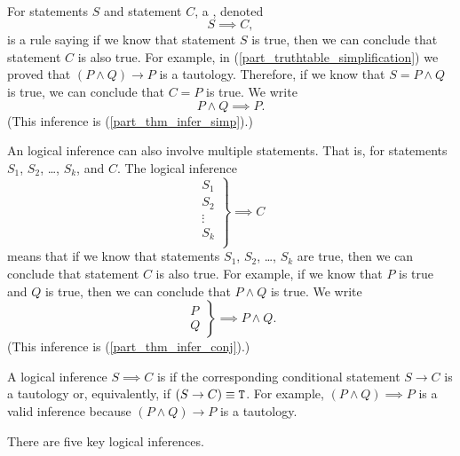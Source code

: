 \begin{defn}
\label{defn_logical_infer}
~
    \begin{apart}
        \item \label{part_defn_infer} For statements $S$ and statement $C$, a , denoted $$S \implies C,$$ is a rule saying if we know that statement $S$ is true, then we can conclude that statement $C$ is also true.  For example, in  (\ref{part_truthtable_simplification}) we proved that $(P \land Q) \to P$ is a tautology.  Therefore, if we know that $S=P \land Q$ is true, we can conclude that $C=P$ is true. We write $$P \land Q \implies P.$$ (This inference is  (\ref{part_thm_infer_simp}).) 
        
        \item An logical inference can also involve multiple statements. That is, for statements $S_1$, $S_2$, \ldots, $S_k$, and $C$.  The logical inference 
            $$\left. \begin{array}{c} 
            S_1 \\ S_2 \\ \vdots \\ S_k \\\end{array} \right\} \implies C$$
        means that if we know that statements $S_1$, $S_2$, \ldots, $S_k$ are true, then we can conclude that statement $C$ is also true.  For example, if we know that $P$ is true and $Q$ is true, then we can conclude that $P \land Q$ is true. We write
            $$\left. \begin{array} {cc} P \\ Q \end{array} \right\} \implies P \land Q.$$
        (This inference is  (\ref{part_thm_infer_conj}).) 
        
        \item A logical inference $S \implies C$ is  if the corresponding conditional statement $S \to C$ is a tautology or, equivalently, if $(S \to C) \equiv \texttt{T}$.  For example, $(P \land Q) \implies P$ is a valid inference because $(P \land Q) \to P$ is a tautology.
    \end{apart} 
\end{defn}

There are five key logical inferences.

